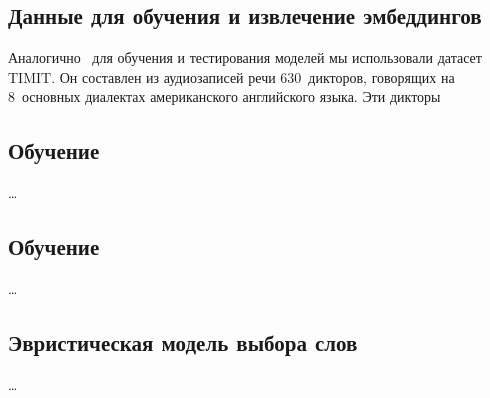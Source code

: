 \subsection{Данные для обучения и извлечение эмбеддингов}

Аналогично~\cite{isrpaper} для обучения и тестирования моделей мы использовали
датасет TIMIT\cite{timit}. Он составлен из аудиозаписей речи 630~дикторов, говорящих
на 8~основных диалектах американского английского языка. Эти дикторы 

\subsection{Обучение \guesser{}}

\ldots

\subsection{Обучение \enquirer{}}

\ldots

\subsection{Эвристическая модель выбора слов}

\ldots